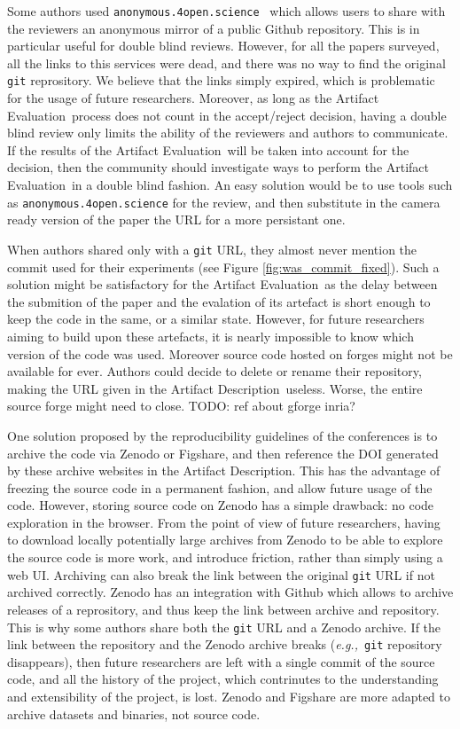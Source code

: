 \documentclass[sigconf]{acmart}
\newcommand{\eg}{\emph{e.g.,}}
\newcommand{\ad}{Artifact Description}
\newcommand{\aeval}{Artifact Evaluation}
\newcommand{\todo}[1]{{\color{red}TODO: #1}}
\begin{document}
Some authors used \texttt{anonymous.4open.science}\ \cite{anonymous_github} which allows users to share with the reviewers an anonymous mirror of a public Github repository.
This is in particular useful for double blind reviews.
However, for all the papers surveyed, all the links to this services were dead, and there was no way to find the original \texttt{git} reprository.
We believe that the links simply expired, which is problematic for the usage of future researchers.
Moreover, as long as the \aeval\ process does not count in the accept/reject decision, having a double blind review only limits the ability of the reviewers and authors to communicate.
If the results of the \aeval\ will be taken into account for the decision, then the community should investigate ways to perform the \aeval\ in a double blind fashion.
An easy solution would be to use tools such as \texttt{anonymous.4open.science} for the review, and then substitute in the camera ready version of the paper the URL for a more persistant one.

When authors shared only with a \texttt{git} URL, they almost never mention the commit used for their experiments (see Figure \ref{fig:was_commit_fixed}).
Such a solution might be satisfactory for the \aeval\ as the delay between the submition of the paper and the evalation of its artefact is short enough to keep the code in the same, or a similar state.
However, for future researchers aiming to build upon these artefacts, it is nearly impossible to know which version of the code was used.
Moreover source code hosted on forges might not be available for ever.
Authors could decide to delete or rename their repository, making the URL given in the \ad\ useless.
Worse, the entire source forge might need to close. \todo{ref about gforge inria?}

One solution proposed by the reproducibility guidelines of the conferences is to archive the code via Zenodo or Figshare, and then reference the DOI generated by these archive websites in the \ad.
This has the advantage of freezing the source code in a permanent fashion, and allow future usage of the code.
However, storing source code on Zenodo has a simple drawback: no code exploration in the browser.
From the point of view of future researchers, having to download locally potentially large archives from Zenodo to be able to explore the source code is more work, and introduce friction, rather than simply using a web UI.
Archiving can also break the link between the original \texttt{git} URL if not archived correctly.
Zenodo has an integration with Github which allows to archive releases of a reprository, and thus keep the link between archive and repository.
This is why some authors share both the \texttt{git} URL and a Zenodo archive.
If the link between the repository and the Zenodo archive breaks (\eg\ \texttt{git} repository disappears), then future researchers are left with a single commit of the source code, and all the history of the project, which contrinutes to the understanding and extensibility of the project, is lost.
Zenodo and Figshare are more adapted to archive datasets and binaries, not source code.
\end{document}

